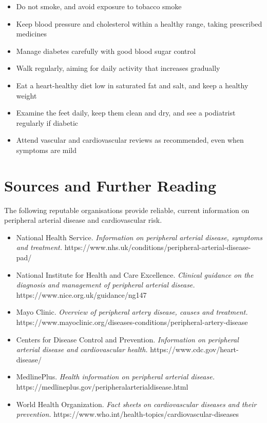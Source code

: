 \begin{itemize}
    \item Do not smoke, and avoid exposure to tobacco smoke
    \item Keep blood pressure and cholesterol within a healthy range, taking prescribed medicines
    \item Manage diabetes carefully with good blood sugar control
    \item Walk regularly, aiming for daily activity that increases gradually
    \item Eat a heart-healthy diet low in saturated fat and salt, and keep a healthy weight
    \item Examine the feet daily, keep them clean and dry, and see a podiatrist regularly if diabetic
    \item Attend vascular and cardiovascular reviews as recommended, even when symptoms are mild
\end{itemize}

\section*{Sources and Further Reading}
The following reputable organisations provide reliable, current information on peripheral arterial disease and cardiovascular risk.

\begin{itemize}
    \item National Health Service. \textit{Information on peripheral arterial disease, symptoms and treatment.} https://www.nhs.uk/conditions/peripheral-arterial-disease-pad/
    \item National Institute for Health and Care Excellence. \textit{Clinical guidance on the diagnosis and management of peripheral arterial disease.} https://www.nice.org.uk/guidance/ng147
    \item Mayo Clinic. \textit{Overview of peripheral artery disease, causes and treatment.} https://www.mayoclinic.org/diseases-conditions/peripheral-artery-disease
    \item Centers for Disease Control and Prevention. \textit{Information on peripheral arterial disease and cardiovascular health.} https://www.cdc.gov/heart-disease/
    \item MedlinePlus. \textit{Health information on peripheral arterial disease.} https://medlineplus.gov/peripheralarterialdisease.html
    \item World Health Organization. \textit{Fact sheets on cardiovascular diseases and their prevention.} https://www.who.int/health-topics/cardiovascular-diseases
\end{itemize}
